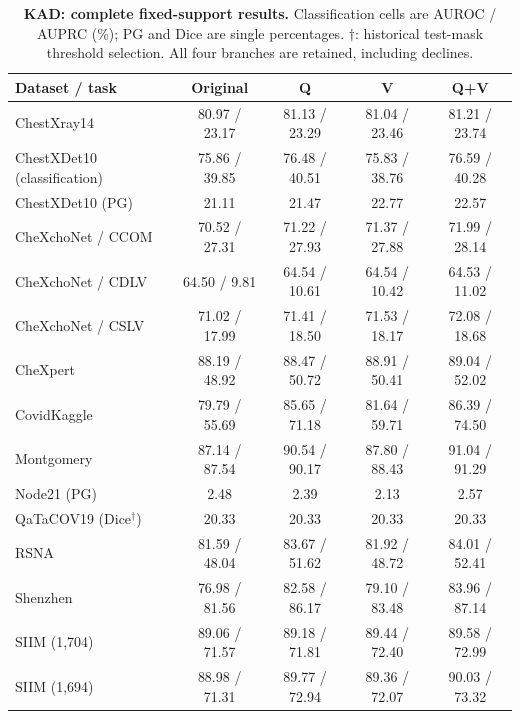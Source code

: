 \begin{table}[tp]
\centering
\caption{\textbf{KAD: complete fixed-support results.} Classification cells are AUROC / AUPRC (\%); PG and Dice are single percentages. $\dagger$: historical test-mask threshold selection. All four branches are retained, including declines.}
\label{tab:supp-fixed-kad}
\small
\setlength{\tabcolsep}{4pt}
\begin{tabular*}{\textwidth}{@{\extracolsep{\fill}}lcccc@{}}
\toprule
Dataset / task & Original & Q & V & Q+V \\
\midrule
ChestXray14 & 80.97 / 23.17 & 81.13 / 23.29 & 81.04 / 23.46 & 81.21 / 23.74 \\
ChestXDet10 (classification) & 75.86 / 39.85 & 76.48 / 40.51 & 75.83 / 38.76 & 76.59 / 40.28 \\
ChestXDet10 (PG) & 21.11 & 21.47 & 22.77 & 22.57 \\
CheXchoNet / CCOM & 70.52 / 27.31 & 71.22 / 27.93 & 71.37 / 27.88 & 71.99 / 28.14 \\
CheXchoNet / CDLV & 64.50 / 9.81 & 64.54 / 10.61 & 64.54 / 10.42 & 64.53 / 11.02 \\
CheXchoNet / CSLV & 71.02 / 17.99 & 71.41 / 18.50 & 71.53 / 18.17 & 72.08 / 18.68 \\
CheXpert & 88.19 / 48.92 & 88.47 / 50.72 & 88.91 / 50.41 & 89.04 / 52.02 \\
CovidKaggle & 79.79 / 55.69 & 85.65 / 71.18 & 81.64 / 59.71 & 86.39 / 74.50 \\
Montgomery & 87.14 / 87.54 & 90.54 / 90.17 & 87.80 / 88.43 & 91.04 / 91.29 \\
Node21 (PG) & 2.48 & 2.39 & 2.13 & 2.57 \\
QaTaCOV19 (Dice$^\dagger$) & 20.33 & 20.33 & 20.33 & 20.33 \\
RSNA & 81.59 / 48.04 & 83.67 / 51.62 & 81.92 / 48.72 & 84.01 / 52.41 \\
Shenzhen & 76.98 / 81.56 & 82.58 / 86.17 & 79.10 / 83.48 & 83.96 / 87.14 \\
SIIM (1,704) & 89.06 / 71.57 & 89.18 / 71.81 & 89.44 / 72.40 & 89.58 / 72.99 \\
SIIM (1,694) & 88.98 / 71.31 & 89.77 / 72.94 & 89.36 / 72.07 & 90.03 / 73.32 \\
\bottomrule
\end{tabular*}
\end{table}

